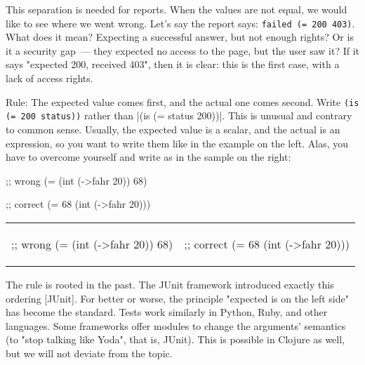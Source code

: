 This separation is needed for reports. When the values are not equal, we would like to see where we went wrong. Let's say the report says: \verb|failed (= 200 403)|. What does it mean? Expecting a successful answer, but not enough rights? Or is it a security gap~--- they expected no access to the page, but the user saw it? If it says "expected 200, received 403", then it is clear: this is the first case, with a lack of access rights.

Rule: The expected value comes first, and the actual one comes second. Write \verb|(is (= 200 status))| rather than \spverb|(is (= status 200))|.
This is unusual and contrary to common sense. Usually, the expected value is a scalar, and the actual is an expression, so you want to write them like in the example on the left. Alas, you have to overcome yourself and write as in the sample on the right:

\ifnarrow

\begin{english}
  \begin{clojure}
;; wrong
(= (int (->fahr 20)) 68)
  \end{clojure}

\splitter

  \begin{clojure}
;; correct
(= 68 (int (->fahr 20)))
  \end{clojure}
\end{english}

\else

\begin{english}

\noindent
\begin{tabular}{ @{}p{5cm} @{}p{5cm} }

  \begin{clojure}
;; wrong
(= (int (->fahr 20)) 68)
  \end{clojure}

&

  \begin{clojure}
;; correct
(= 68 (int (->fahr 20)))
  \end{clojure}

\end{tabular}

\end{english}

\fi


The rule is rooted in the past. The JUnit framework introduced exactly this ordering [JUnit]. For better or worse, the principle "expected is on the left side" has become the standard. Tests work similarly in Python, Ruby, and other languages. Some frameworks offer modules to change the arguments' semantics (to "stop talking like Yoda", that is, JUnit). This is possible in Clojure as well, but we will not deviate from the topic.

